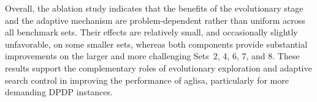 \documentclass[pdflatex]{sn-jnl}
\begin{document}
Overall, the ablation study indicates that the benefits of the evolutionary stage and the adaptive mechanism are problem-dependent rather than uniform across all benchmark sets. Their effects are relatively small, and occasionally slightly unfavorable, on some smaller sets, whereas both components provide substantial improvements on the larger and more challenging Sets~2, 4, 6, 7, and 8. These results support the complementary roles of evolutionary exploration and adaptive search control in improving the performance of \gls{aglisa}, particularly for more demanding DPDP instances.



\end{document}
